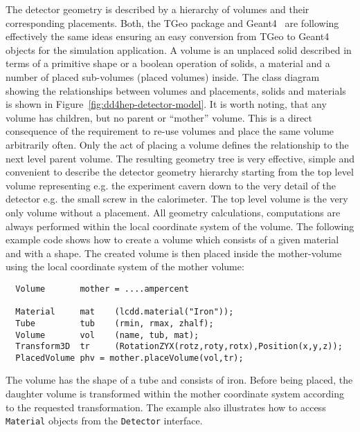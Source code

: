 The detector geometry is described by a hierarchy of volumes and their  corresponding placements. Both, the TGeo package and Geant4~\cite{Agostinelli:2002hh} are following effectively the same ideas ensuring an easy conversion from TGeo to Geant4 objects for the simulation application. A volume is an unplaced solid de\-scribed in terms of a primitive shape or a boolean operation of solids, a material and a number of placed sub-volumes (placed volumes) inside. The class diagram showing the relationships between volumes and placements, solids and materials is shown in Figure~\ref{fig:dd4hep-detector-model}.
It is worth noting, that any volume has children, but no parent or ``mother'' volume. This is a direct consequence of the requirement to re-use volumes and place the same volume arbitrarily often. Only the act of placing a volume defines the relationship to the next level parent volume. The resulting geometry tree is very effective, simple and convenient to  describe the detector geometry hierarchy starting from the top level volume representing e.g. the experiment cavern down to the very detail of the detector e.g. the small screw in the calorimeter. The top level volume is the very only volume without a placement. All geometry calculations, computations are always  performed within the local coordinate system of the volume. The following example code shows how to create a volume which consists of a given material and with a shape. The created volume is then placed inside the mother-volume using the local coordinate system of the mother volume:

\begin{verbatim}
  Volume       mother = ....ampercent

  Material     mat    (lcdd.material("Iron"));
  Tube         tub    (rmin, rmax, zhalf);
  Volume       vol    (name, tub, mat);
  Transform3D  tr     (RotationZYX(rotz,roty,rotx),Position(x,y,z));
  PlacedVolume phv = mother.placeVolume(vol,tr);
\end{verbatim}

The volume has the shape of a tube and consists of iron. Before being placed, the daughter volume is transformed within the mother coordinate system according to the requested transformation. The example also illustrates how to access \texttt{Material} objects from the \texttt{Detector} interface.

